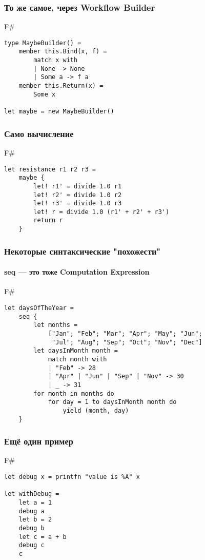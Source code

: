 \documentclass[xetex,mathserif,serif]{beamer}
\begin{document}
	\begin{frame}[fragile]
		\frametitle{То же самое, через Workflow Builder}
		\begin{exampleblock}{F\#}
			\begin{verbatim}
type MaybeBuilder() =
    member this.Bind(x, f) = 
        match x with
        | None -> None
        | Some a -> f a
    member this.Return(x) = 
        Some x
   
let maybe = new MaybeBuilder()
			\end{verbatim}
		\end{exampleblock}
\end{frame}

	\begin{frame}[fragile]
		\frametitle{Само вычисление}
		\begin{exampleblock}{F\#}
			\begin{verbatim}
let resistance r1 r2 r3 = 
    maybe {
        let! r1' = divide 1.0 r1
        let! r2' = divide 1.0 r2
        let! r3' = divide 1.0 r3
        let! r = divide 1.0 (r1' + r2' + r3')
        return r
    }
			\end{verbatim}
		\end{exampleblock}
\end{frame}

	\begin{frame}[fragile]
		\frametitle{Некоторые синтаксические "похожести"}
		\framesubtitle{seq --- это тоже Computation Expression}
		\begin{exampleblock}{F\#}
			\begin{verbatim}
let daysOfTheYear =
    seq {
        let months =
            ["Jan"; "Feb"; "Mar"; "Apr"; "May"; "Jun";
             "Jul"; "Aug"; "Sep"; "Oct"; "Nov"; "Dec"]
        let daysInMonth month =
            match month with
            | "Feb" -> 28
            | "Apr" | "Jun" | "Sep" | "Nov" -> 30
            | _ -> 31
        for month in months do
            for day = 1 to daysInMonth month do
                yield (month, day)
    }
			\end{verbatim}
		\end{exampleblock}
\end{frame}

	\begin{frame}[fragile]
		\frametitle{Ещё один пример}
		\begin{exampleblock}{F\#}
			\begin{verbatim}
let debug x = printfn "value is %A" x

let withDebug = 
    let a = 1
    debug a
    let b = 2
    debug b
    let c = a + b
    debug c
    c
			\end{verbatim}
		\end{exampleblock}
\end{frame}
\end{document}
